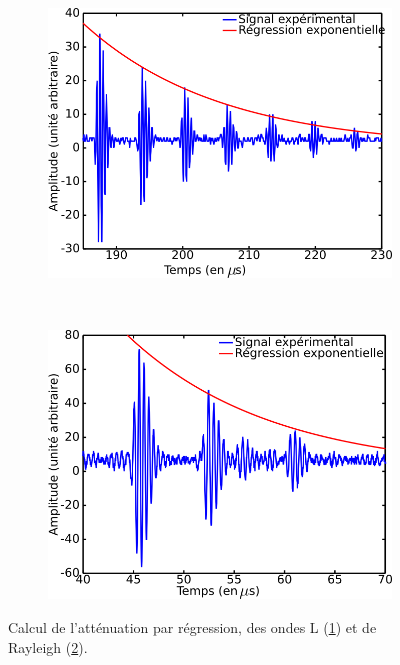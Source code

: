 \documentclass[twoside]{article}
\begin{document}
\begin{multicols}{2}
\begin{figure}[H]
	\centering
	\begin{subfigure}[b]{0.5\textwidth}
	    \centering
        \includegraphics[scale=0.45]{figures/attenuationL.png}
        \label{attenuationL}
    \end{subfigure}\\\vspace{0.5cm}
	\begin{subfigure}[b]{0.5\textwidth}
	    \centering
        \includegraphics[scale=0.45]{figures/attenuationR.png}       
        \label{attenuationR}
    \end{subfigure}
	\caption{\label{attenuation}Calcul de l'atténuation par régression, des ondes L (\ref{attenuationL}) et de Rayleigh (\ref{attenuationR}).}
\end{figure}


\end{multicols}
\end{document}
